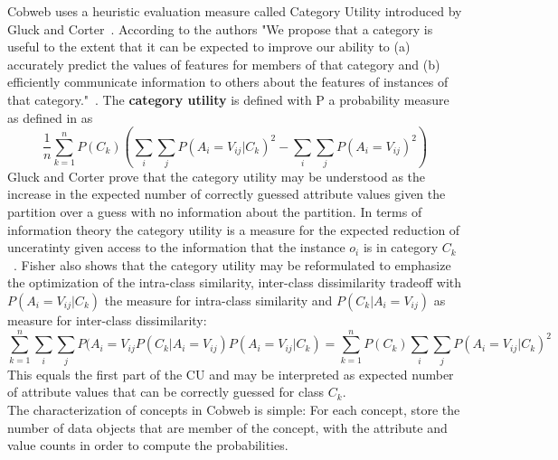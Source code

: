 Cobweb uses a heuristic evaluation measure called Category Utility introduced by Gluck and Corter~\cite{gluck1985information}. According to the authors "We propose that a category is useful to the extent that it can be expected to improve our ability to (a) accurately predict the values of features for members of that category and (b) efficiently communicate information to others about the features of instances of that category."~\cite{gluck1985information}. 
The \textbf{category utility} is defined with P a probability measure as defined in  as
\[ \frac{1}{n} \sum_{k = 1}^n P(C_k) ( \sum_i \sum_j P(A_i = V_{ij}| C_k)^2 - \sum_i \sum_j P(A_i = V_{ij})^2) \]
Gluck and Corter prove that the category utility may be understood as the increase in the expected number of correctly guessed attribute values given the partition over a guess with no information about the partition. In terms of information theory the category utility is a measure for the expected reduction of unceratinty given access to the information that the instance $o_i$ is in category $C_k$~\cite{corter1992explaining}. Fisher also shows that the category utility may be reformulated to emphasize the optimization of the intra-class similarity, inter-class dissimilarity tradeoff with $P(A_i = V_{ij} | C_k)$ the measure for intra-class similarity and $P(C_k | A_i = V_{ij})$ as measure for inter-class dissimilarity: \[ \sum_{k = 1}^n \sum_i \sum_j P(A_i = V_{ij} P(C_k| A_i = V_{ij})P(A_i = V_{ij}| C_k) = \sum_{k = 1}^n P(C_k) \sum_i \sum_j P(A_i = V_{ij}| C_k)^2 \]
This equals the first part of the CU and may be interpreted as expected number of attribute values that can be correctly guessed for class $C_k$. \\

The characterization of concepts in Cobweb is simple: For each concept, store the number of data objects that are member of the concept, with the attribute and value counts in order to compute the probabilities. \\
 \\

